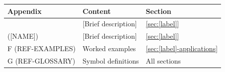 %
%
\begin{tcolorbox}[
    colback=yellow!10!white,
    colframe=orange!75!black,
    title={\textbf{Appendix References for This Chapter}},
    fonttitle=\bfseries
]
\begin{tabular}{lll}
\textbf{Appendix} & \textbf{Content} & \textbf{Section} \\
\midrule
[CODE] ([NAME]) & [Brief description] & \ref{sec:[label]} \\
[CODE] ([NAME]) & [Brief description] & \ref{sec:[label]} \\
F (REF-EXAMPLES) & Worked examples & \ref{sec:[label]-applications} \\
G (REF-GLOSSARY) & Symbol definitions & All sections
\end{tabular}
\end{tcolorbox}



